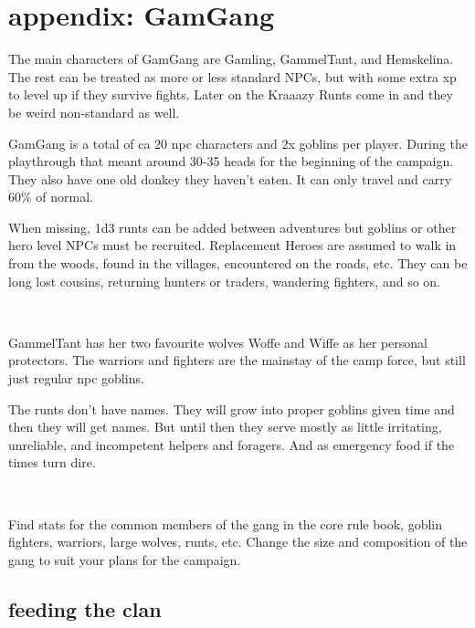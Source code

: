 \section*{appendix: GamGang}




The main characters of GamGang are Gamling, GammelTant, and Hemskelina. The rest can be treated as more or less standard NPCs, but with some extra xp to level up if they survive fights. Later on the Kraaazy Runts come in and they be weird non-standard as well.

GamGang is a total of ca 20 npc characters and 2x goblins per player. During the playthrough that meant around 30-35 heads for the beginning of the campaign. They also have one old donkey they haven't eaten. It can only travel and carry 60\% of normal.

When missing, 1d3 runts can be added between adventures but goblins or other hero level NPCs must be recruited. Replacement Heroes are assumed to walk in from the woods, found in the villages, encountered on the roads, etc. They can be long lost cousins, returning hunters or traders, wandering fighters, and so on.

\

GammelTant has her two favourite wolves Woffe and Wiffe as her personal protectors.  The warriors and fighters are the mainstay of the camp force, but still just regular npc goblins.

The runts don't have names. They will grow into proper goblins given time and then they will get names. But until then they serve mostly as little irritating, unreliable, and incompetent helpers and foragers. And as emergency food if the times turn dire.

\

Find stats for the common members of the gang in the core rule book, goblin fighters, warriors, large wolves, runts, etc. Change the size and composition of the gang to suit your plans for the campaign.


\subsection*{feeding the clan}

